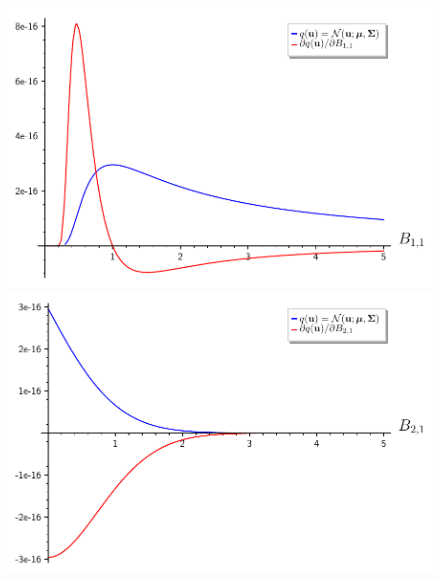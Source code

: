 \documentclass{mpaper}
\begin{document}
\begin{figure}
  \centering
  \begin{minipage}{.5\textwidth}
    \centering
    \includegraphics[width=\columnwidth]{sage1}
    \includegraphics[width=\columnwidth]{sage2}
  \end{minipage}%
  \begin{minipage}{.5\textwidth}
    \centering

\end{minipage}
\end{figure}
\end{document}
